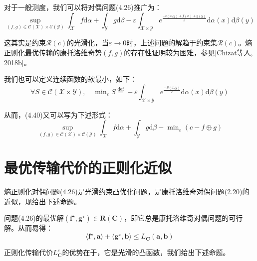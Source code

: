 \documentclass[cn,10pt,math=newtx,citestyle=gb7714-2015,bibstyle=gb7714-2015]{elegantbook}
\begin{document}
\begin{postulate}[正则化对偶问题在一般测度上的推广]
对于一般测度，我们可以将对偶问题(4.26)推广为：
\begin{equation}
    \label{4.40}
    \sup_{(f,g)\in\mathcal{C(X)}\times \mathcal{C(Y)}} \int_\mathcal{X} f\text{d}\alpha+ \int_\mathcal{Y} g\text{d}\beta - \varepsilon \int_{\mathcal{X}\times \mathcal{Y}} e^{\frac{-c(x,y)+f(x)+g(y)}{\varepsilon}} \text{d}\alpha(x)\text{d}\beta(y)
\end{equation}

这其实是约束$\mathcal{R}(c)$的光滑化，当$\varepsilon \to 0$时，上述问题的解趋于约束集$\mathcal{R}(c)$。熵正则化最优传输的康托洛维奇势$(f,g)$的存在性证明较为困难，参见[Chizat等人, 2018b]。

我们也可以定义连续函数的软最小，如下：
\begin{equation*}
    \forall S\in\mathcal{C}(\mathcal{X}\times \mathcal{Y}), \quad \min\nolimits_\varepsilon S\overset{\text{def}}{=}- \varepsilon \int_{\mathcal{X}\times \mathcal{Y}} e^{\frac{-S(x,y)}{\varepsilon}} \text{d}\alpha(x)\text{d}\beta(y)
\end{equation*}

从而，(4.40)又可以写为下述形式：
\begin{equation}
    \label{4.41}
    \sup_{(f,g)\in\mathcal{C(X)}\times \mathcal{C(Y)}} \int_\mathcal{X} f\text{d}\alpha+ \int_\mathcal{Y} g\text{d}\beta - \min\nolimits_\varepsilon (c-f\oplus g)
\end{equation}
\end{postulate}

\section{最优传输代价的正则化近似}

熵正则化对偶问题(4.26)是光滑约束凸优化问题，是康托洛维奇对偶问题(2.20)的近似，现给出下述命题。

\begin{proposition}
    问题(4.26)的最优解$(\mathbf{f}^\star,\mathbf{g}^\star)\in \mathbf{R(C)}$，即它总是康托洛维奇对偶问题的可行解。从而易得：
    \begin{equation*}
        \langle \mathbf{f}^\star, \mathbf{a} \rangle + \langle \mathbf{g}^\star, \mathbf{b} \rangle \leq L_\mathbf{C}(\mathbf{a,b})
    \end{equation*}
\end{proposition}

正则化传输代价$L_\mathbf{C}^\varepsilon$的优势在于，它是光滑的凸函数，我们给出下述命题。
\end{document}
